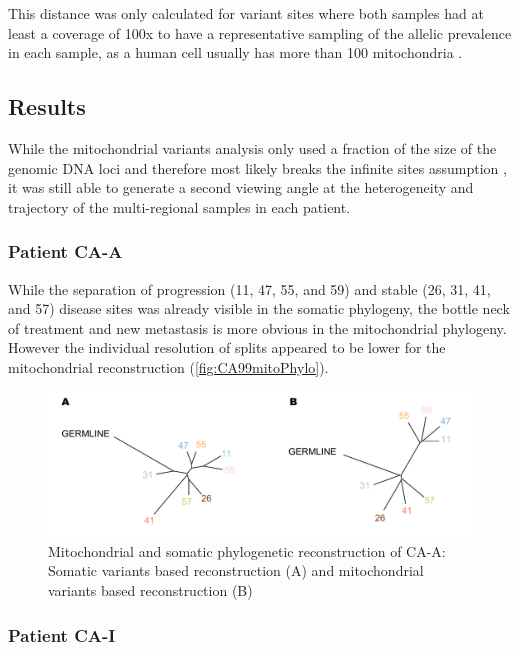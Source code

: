 This distance was only calculated for variant sites where both samples had at least a coverage of 100x to have a representative sampling of the allelic prevalence in each sample, as a human cell usually has more than 100 mitochondria \cite{Cole2016}.


\subsection{Results}
\label{cascade-sec:mitoResults}
While the mitochondrial variants analysis only used a fraction of the size of the genomic DNA loci and therefore most likely breaks the infinite sites assumption \cite{Kimura1969}, it was still able to generate a second viewing angle at the heterogeneity and trajectory of the multi-regional samples in each patient.

\subsubsection{Patient CA-A}

While the separation of progression (11, 47, 55, and 59) and stable (26, 31, 41, and 57) disease sites was already visible in the somatic phylogeny, the bottle neck of treatment and new metastasis is more obvious in the mitochondrial phylogeny. However the individual resolution of splits appeared to be lower for the mitochondrial reconstruction (\autoref{fig:CA99mitoPhylo}).


\begin{figure}[h]
\centering
\includegraphics[width=.99\linewidth]{Figures/CASCADE/mito/CA99SomVsMitoPhylo.pdf}
\caption[Mitochondrial and somatic phylogenetic reconstruction of CA-A]{Mitochondrial and somatic phylogenetic reconstruction of CA-A: Somatic variants based reconstruction (A) and mitochondrial variants based reconstruction (B)} \label{fig:CA99mitoPhylo}
\end{figure}

\subsubsection{Patient CA-I}

